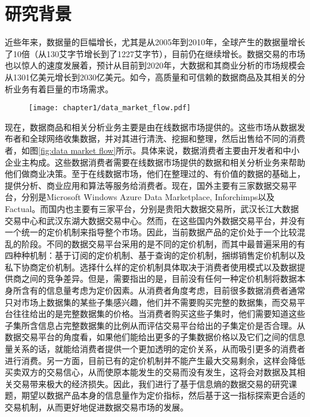 \chapter{研究背景}

近些年来，数据量的巨幅增长，尤其是从2005年到2010年，全球产生的数据量增长了10倍（从130艾字节增长到了1227艾字节），目前仍在继续增长\cite{gantz2012digital,villars2011big}。数据交易的市场也以惊人的速度发展着，预计从目前到2020年，大数据和其商业分析的市场规模会从1301亿美元增长到2030亿美元\cite{idc}。如今，高质量和可信赖的数据商品及其相关的分析业务有着巨量的市场需求\cite{gantz2012digital,maitland2002european,turner2014digital,villars2011big}。

\begin{figure}[!htp]
  \centering
  \texttt{[image: chapter1/data\_market\_flow.pdf]}
\end{figure}

现在，数据商品和相关分析业务主要是由在线数据市场提供的。这些市场从数据发布者和全球网络收集数据，并对其进行清洗、挖掘和整理，然后出售给不同的消费者，如图\ref{fig:data market flow}所示。具体来说，数据消费者主要由开发者和中小企业主构成。这些数据消费者需要在线数据市场提供的数据和相关分析业务来帮助他们做商业决策。至于在线数据市场，他们在整理过的、有价值的数据的基础上，提供分析、商业应用和算法等服务给消费者。现在，国外主要有三家数据交易平台，分别是Microsoft Windows Azure Data Marketplace\cite{MicrosoftAzure}, Inforchimps\cite{infochimps}以及Factual\cite{factual}。而国内也主要有三家平台，分别是贵阳大数据交易所\cite{gbdex}，武汉长江大数据交易中心和武汉东湖大数据交易中心\cite{chinadatatrading}。然而，在这些国内外数据交易平台，并没有一个统一的定价机制来指导整个市场。因此，当前数据产品的定价处于一个比较混乱的阶段。不同的数据交易平台采用的是不同的定价机制，而其中最普遍采用的有四种种机制：基于订阅的定价机制、基于查询的定价机制，捆绑销售定价机制以及私下协商定价机制。选择什么样的定价机制具体取决于消费者使用模式以及数据提供商之间的竞争差异。但是，需要指出的是，目前没有任何一种定价机制将数据本身所含有的信息量考虑为定价因素。从消费者角度考虑，目前很多数据消费者通常只对市场上数据集的某些子集感兴趣，他们并不需要购买完整的数据集，而交易平台往往给出的是完整数据集的价格。当消费者购买这些子集时，他们需要知道这些子集所含信息占完整数据集的比例从而评估交易平台给出的子集定价是否合理。从数据交易平台的角度看，如果他们能给出更多的子集数据价格以及它们之间的信息量关系的话，就能给消费者提供一个更加透明的定价关系，从而吸引更多的消费者进行消费。另一方面，目前已有的定价机制并不能产生最大交易剩余，这样会降低买卖双方的交易信心，从而使原本能发生的交易而没有发生，这将会对数据及其相关交易带来极大的经济损失。因此，我们进行了基于信息熵的数据交易的研究课题，期望以数据产品本身的信息量作为定价指标，然后基于这一指标探索更合适的交易机制，从而更好地促进数据交易市场的发展。
